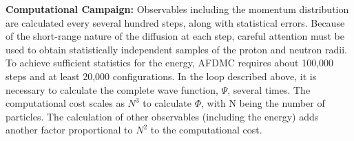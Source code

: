 \documentclass[12pt,letterpaper]{article}
\begin{document}
\textbf{Computational Campaign:} Observables including the momentum 
distribution are calculated every several hundred steps, along with 
statistical errors. Because of the short-range nature of the diffusion at 
each step, careful attention must be used to obtain statistically 
independent samples of the proton and neutron radii. To achieve sufficient 
statistics for the energy, AFDMC requires about 100,000 steps and at least 
20,000 configurations. In the loop described above, it is necessary to 
calculate the complete wave function, $\Psi$, several times. The 
computational cost scales as $N^3$ to calculate $\Phi$, with N being the 
number of particles. The calculation of other observables (including the 
energy) adds another factor proportional to $N^2$ to the computational cost.

\newpage


\end{document}
